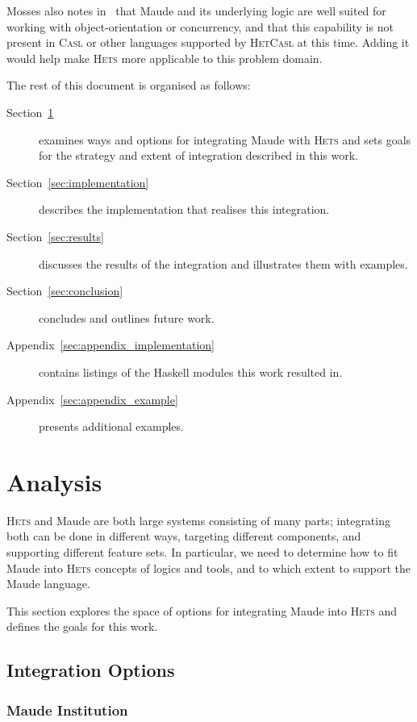\documentclass[11pt]{article}
\newcommand{\Casl}{\textsc{Casl}}
\newcommand{\HetCasl}{\textsc{HetCasl}}
\newcommand{\Hets}{\textsc{Hets}}
\begin{document}
Mosses also notes in~\cite{Mosses:2008} that Maude and its underlying logic are well suited for working with object-orientation or concurrency, and that this capability is not present in \Casl{} or other languages supported by \HetCasl{} at this time. Adding it would help make \Hets{} more applicable to this problem domain.

The rest of this document is organised as follows:
\begin{description}
  \item[Section~\ref{sec:analysis}] examines ways and options for integrating Maude with \Hets{} and sets goals for the strategy and extent of integration described in this work.
  \item[Section~\ref{sec:implementation}] describes the implementation that realises this integration.
  \item[Section~\ref{sec:results}] discusses the results of the integration and illustrates them with examples.
  \item[Section~\ref{sec:conclusion}] concludes and outlines future work.
  \item[Appendix~\ref{sec:appendix_implementation}] contains listings of the Haskell modules this work resulted in.
  \item[Appendix~\ref{sec:appendix_example}] presents additional examples.
\end{description}


\clearpage
\section{Analysis} %
\label{sec:analysis}

\Hets{} and Maude are both large systems consisting of many parts; integrating both can be done in different ways, targeting different components, and supporting different feature sets. In particular, we need to determine how to fit Maude into \Hets{} concepts of logics and tools, and to which extent to support the Maude language.

This section explores the space of options for integrating Maude into \Hets{} and defines the goals for this work.

\subsection{Integration Options}
\label{sec:2_1}

\subsubsection{Maude Institution}
\label{sec:2_1_1}
\end{document}
